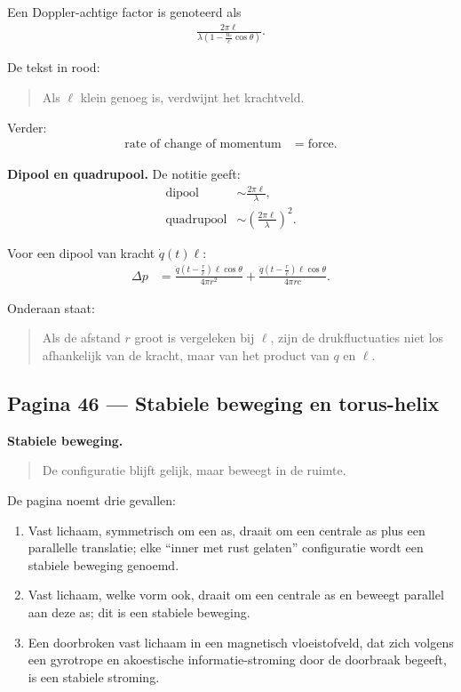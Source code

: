 \documentclass[11pt]{article}
\begin{document}
Een Doppler-achtige factor is genoteerd als
\begin{align*}
\frac{2\pi\ell}{\lambda\left(1-\frac{u_e}{c}\cos\theta\right)}.
\end{align*}

De tekst in rood:
\begin{quote}
Als $\ell$ klein genoeg is, verdwijnt het krachtveld.
\end{quote}

Verder:
\begin{align*}
\text{rate of change of momentum}
  &= \text{force}.
\end{align*}

\textbf{Dipool en quadrupool.}
De notitie geeft:
\begin{align*}
\text{dipool} &\sim \frac{2\pi\ell}{\lambda},\\
\text{quadrupool} &\sim \left(\frac{2\pi\ell}{\lambda}\right)^2.
\end{align*}

Voor een dipool van kracht $\dot{q}(t)\ell$:
\begin{align*}
\Delta p
  &=
  \frac{\dot{q}\left(t-\frac{r}{c}\right)\ell\cos\theta}{4\pi r^2}
  +
  \frac{\ddot{q}\left(t-\frac{r}{c}\right)\ell\cos\theta}{4\pi r c}.
\end{align*}

Onderaan staat:
\begin{quote}
Als de afstand $r$ groot is vergeleken bij $\ell$, zijn de drukfluctuaties niet los afhankelijk van de kracht, maar van het product van $q$ en $\ell$.
\end{quote}

\subsection*{Pagina 46 --- Stabiele beweging en torus-helix}

\textbf{Stabiele beweging.}
\begin{quote}
De configuratie blijft gelijk, maar beweegt in de ruimte.
\end{quote}

De pagina noemt drie gevallen:
\begin{enumerate}
\item Vast lichaam, symmetrisch om een as, draait om een centrale as plus een parallelle translatie; elke ``inner met rust gelaten'' configuratie wordt een stabiele beweging genoemd.
\item Vast lichaam, welke vorm ook, draait om een centrale as en beweegt parallel aan deze as; dit is een stabiele beweging.
\item Een doorbroken vast lichaam in een magnetisch vloeistofveld, dat zich volgens een gyrotrope en akoestische informatie-stroming door de doorbraak begeeft, is een stabiele stroming.
\end{enumerate}
\end{document}
